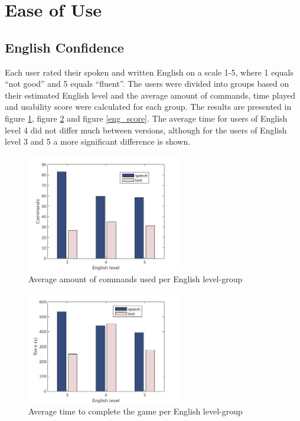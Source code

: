 \section{Ease of Use}

\subsection{English Confidence} \label{sec:eng_con}
Each user rated their spoken and written English on a scale 1-5, where 1 equals ``not good'' and 5 equals ``fluent''. The users were divided into groups based on their estimated English level and the average amount of commands, time played and usability score were calculated for each group. The results are presented in figure \ref{eng_cmd}, figure \ref{eng_time} and figure \ref{eng_score}. The average time for users of English level 4 did not differ much between versions, although for the users of English level 3 and 5 a more significant difference is shown.

\begin{figure}[ht]
  \centering
  \includegraphics[width=0.6\textwidth]{images/english_cmd.jpg}
  \caption{Average amount of commands used per English level-group}\label{eng_cmd}
\end{figure}

\begin{figure}[ht]
  \centering
  \includegraphics[width=0.6\textwidth]{images/english_time.jpg}
  \caption{Average time to complete the game per English level-group}\label{eng_time}
\end{figure}

